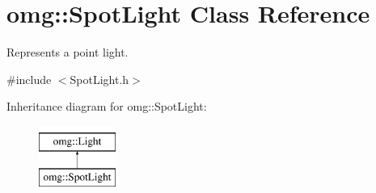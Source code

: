\hypertarget{classomg_1_1_spot_light}{}\section{omg\+::Spot\+Light Class Reference}
\label{classomg_1_1_spot_light}


Represents a point light.  




{\ttfamily \#include $<$Spot\+Light.\+h$>$}

Inheritance diagram for omg\+::Spot\+Light\+:\begin{figure}[H]
\begin{center}
\leavevmode
\includegraphics[height=2.000000cm]{classomg_1_1_spot_light}
\end{center}
\end{figure}
